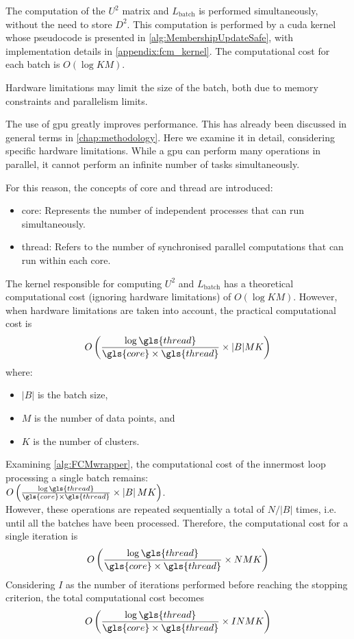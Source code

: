 \begin{toReview}
	\noindent The computation of the $U^2$ matrix and $L_\text{batch}$ is performed simultaneously, without the need to store $D^2$. This computation is performed by a \gls{cuda} kernel whose pseudocode is presented in \cref{alg:MembershipUpdateSafe}, with implementation details in \cref{appendix:fcm_kernel}. The computational cost for each batch is $O(\log KM)$.

	\bigskip\noindent Hardware limitations may limit the size of the batch, both due to memory constraints and parallelism limits.

	\noindent The use of \gls{gpu} greatly improves performance. This has already been discussed in general terms in \cref{chap:methodology}. Here we examine it in detail, considering specific hardware limitations. While a \gls{gpu} can perform many operations in parallel, it cannot perform an infinite number of tasks simultaneously.

	\noindent For this reason, the concepts of \gls{core} and \gls{thread} are introduced:
	\begin{itemize}
		\item \gls{core}: Represents the number of independent processes that can run simultaneously.
		\item \gls{thread}: Refers to the number of synchronised parallel computations that can run within each \gls{core}.
	\end{itemize}

	\noindent The kernel responsible for computing $U^2$ and $L_\text{batch}$ has a theoretical computational cost (ignoring hardware limitations) of $O(\log KM)$. However, when hardware limitations are taken into account, the practical computational cost is
	\[
		O\left(\frac{\log\gls{thread}}{\gls{core}\times\gls{thread}}\times|B|MK\right)
	\]
	where:
	\begin{itemize}
		\item $\left|B\right|$ is the batch size,
		\item $M$ is the number of data points, and
		\item $K$ is the number of clusters.
	\end{itemize}

	\noindent Examining \cref{alg:FCMwrapper}, the computational cost of the innermost loop processing a single batch remains:\\
	$O\left(\frac{\log\gls{thread}}{\gls{core}\times\gls{thread}}\times\left|B\right|MK\right)$.\\ However, these operations are repeated sequentially a total of $N/\left|B\right|$ times, i.e. until all the batches have been processed. Therefore, the computational cost for a single iteration is
	\[
	O\left(\frac{\log\gls{thread}}{\gls{core}\times\gls{thread}}\times NMK\right)
	\]
	Considering $I$ as the number of iterations performed before reaching the stopping criterion, the total computational cost becomes
	\[
	O\left(\frac{\log\gls{thread}}{\gls{core}\times\gls{thread}}\times INMK\right)
	\]


\end{toReview}
